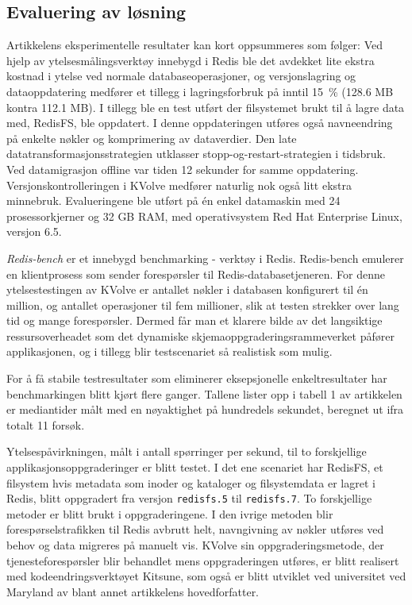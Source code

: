 \subsection{Evaluering av løsning}
Artikkelens eksperimentelle resultater kan kort oppsummeres som følger: Ved hjelp av ytelsesmålingsverktøy innebygd i Redis ble det avdekket lite ekstra kostnad i ytelse ved normale databaseoperasjoner, og versjonslagring og dataoppdatering medfører et tillegg i lagringsforbruk på inntil 15~\% (128.6 MB kontra 112.1 MB). I tillegg ble en test utført der filsystemet brukt til å lagre data med, RedisFS, ble oppdatert. I denne oppdateringen utføres også navneendring på enkelte nøkler og komprimering av dataverdier. Den late datatransformasjonsstrategien utklasser stopp-og-restart-strategien i tidsbruk. Ved datamigrasjon offline var tiden 12 sekunder for samme oppdatering. Versjonskontrolleringen i KVolve medfører naturlig nok også litt ekstra minnebruk. Evalueringene ble utført på én enkel datamaskin med 24 prosessorkjerner og 32 GB RAM, med operativsystem Red Hat Enterprise Linux, versjon 6.5.

\emph{Redis-bench} er et innebygd benchmarking - verktøy i Redis. Redis-bench emulerer en klientprosess som sender forespørsler til Redis-databasetjeneren. For denne ytelsestestingen av KVolve er antallet nøkler i databasen konfigurert til én million, og antallet operasjoner til fem millioner, slik at testen strekker over lang tid og mange forespørsler. Dermed får man et klarere bilde av det langsiktige ressursoverheadet som det dynamiske skjemaoppgraderingsrammeverket påfører applikasjonen, og i tillegg blir testscenariet så realistisk som mulig.

For å få stabile testresultater som eliminerer eksepsjonelle enkeltresultater har benchmarkingen blitt kjørt flere ganger. Tallene \cite{saur2016} lister opp i tabell 1 av artikkelen er mediantider målt med en nøyaktighet på hundredels sekundet, beregnet ut ifra totalt 11 forsøk.

Ytelsespåvirkningen, målt i antall spørringer per sekund, til to forskjellige applikasjonsoppgraderinger er blitt testet. I det ene scenariet har RedisFS, et filsystem hvis metadata som inoder og kataloger og filsystemdata er lagret i Redis, blitt oppgradert fra versjon \texttt{redisfs.5} til \texttt{redisfs.7}. To forskjellige metoder er blitt brukt i oppgraderingene. I den ivrige metoden blir forespørselstrafikken til Redis avbrutt helt, navngivning av nøkler utføres ved behov og data migreres på manuelt vis. KVolve sin oppgraderingsmetode, der tjenesteforespørsler blir behandlet mens oppgraderingen utføres, er blitt realisert med kodeendringsverktøyet Kitsune, som også er blitt utviklet ved universitet ved Maryland av blant annet artikkelens hovedforfatter.

